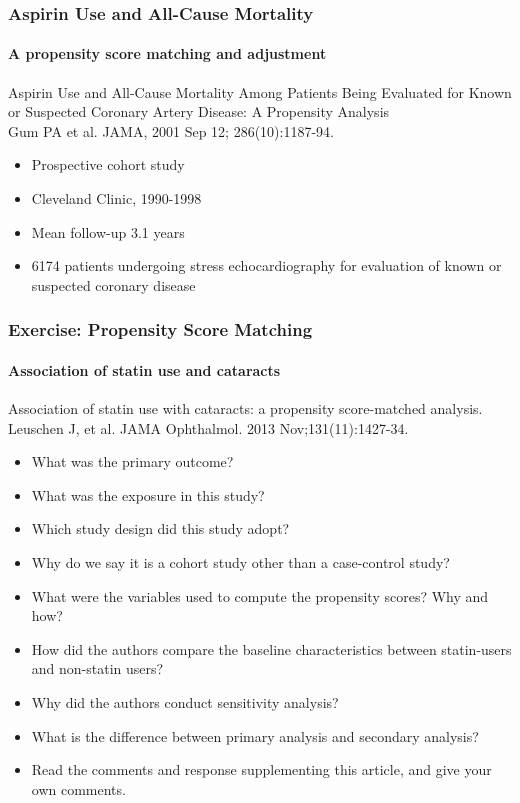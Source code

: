 \documentclass[table,10pt]{beamer}
\begin{document}
\begin{CJK*}{UTF8}{gbsn}
\begin{frame}[t]
\frametitle{Aspirin Use and All-Cause Mortality}
\framesubtitle{A propensity score matching and adjustment}
{\large \alert{Aspirin Use and All-Cause Mortality Among Patients Being Evaluated for Known or Suspected 
Coronary Artery Disease: A Propensity Analysis}}\\
\small{Gum PA et al. JAMA, 2001 Sep 12; 286(10):1187-94.}
\begin{itemize}
	\item Prospective cohort study
	\item Cleveland Clinic, 1990-1998
	\item Mean follow-up 3.1 years
	\item 6174 patients undergoing stress echocardiography for evaluation of known or suspected 
		coronary disease
\end{itemize}
\end{frame}


\begin{frame}[t]
\frametitle{Exercise: Propensity Score Matching}
\framesubtitle{Association of statin use and cataracts}
{\large \alert{Association of statin use with cataracts: a propensity score-matched analysis.}}\\
\small{Leuschen J, et al. JAMA Ophthalmol. 2013 Nov;131(11):1427-34.}
\begin{itemize}
	\item What was the primary outcome?
	\item What was the exposure in this study?
	\item Which study design did this study adopt?
	\item Why do we say it is a cohort study other than a case-control study?
	\item What were the variables used to compute the propensity scores? Why and how?
	\item How did the authors compare the baseline characteristics between statin-users 
		and non-statin users?
	\item Why did the authors conduct sensitivity analysis?
	\item What is the difference between primary analysis and secondary analysis?
	\item Read the comments and response supplementing this article, and give your 
		own comments.
\end{itemize}
\end{frame}


\end{CJK*}
\end{document}
